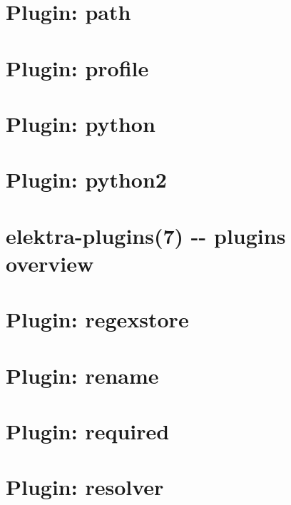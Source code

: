 \documentclass[twoside]{book}
\newcommand{\+}{\discretionary{\mbox{\scriptsize$\hookleftarrow$}}{}{}}
\begin{document}
\chapter{Plugin\+: path}
\label{md_src_plugins_path_README}
\hypertarget{md_src_plugins_path_README}{}

\chapter{Plugin\+: profile}
\label{md_src_plugins_profile_README}
\hypertarget{md_src_plugins_profile_README}{}

\chapter{Plugin\+: python}
\label{md_src_plugins_python_README}
\hypertarget{md_src_plugins_python_README}{}

\chapter{Plugin\+: python2}
\label{md_src_plugins_python2_README}
\hypertarget{md_src_plugins_python2_README}{}

\chapter{elektra-\/plugins(7) -\/-\/ plugins overview}
\label{md_src_plugins_README}
\hypertarget{md_src_plugins_README}{}

\chapter{Plugin\+: regexstore}
\label{md_src_plugins_regexstore_README}
\hypertarget{md_src_plugins_regexstore_README}{}

\chapter{Plugin\+: rename}
\label{md_src_plugins_rename_README}
\hypertarget{md_src_plugins_rename_README}{}

\chapter{Plugin\+: required}
\label{md_src_plugins_required_README}
\hypertarget{md_src_plugins_required_README}{}

\chapter{Plugin\+: resolver}
\label{md_src_plugins_resolver_README}
\hypertarget{md_src_plugins_resolver_README}{}

\end{document}
